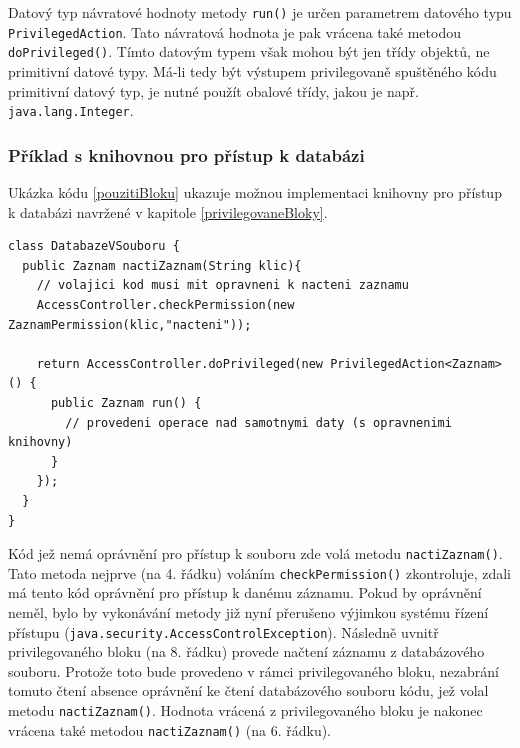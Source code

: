 Datový typ návratové hodnoty metody {\tt run()} je určen parametrem datového typu {\tt PrivilegedAction}.
Tato návratová hodnota je pak vrácena také metodou {\tt doPrivileged()}.
Tímto datovým typem však mohou být jen třídy objektů, ne primitivní datové typy.
Má-li tedy být výstupem privilegovaně spuštěného kódu primitivní datový typ, je nutné použít obalové třídy, jakou je např. {\tt java.lang.Integer}.

\subsubsection{Příklad s knihovnou pro přístup k databázi}\label{databazeVsouboru}

Ukázka kódu \ref{pouzitiBloku} ukazuje možnou implementaci knihovny pro přístup k databázi navržené v kapitole \ref{privilegovaneBloky}.

\begin{lstlisting}[caption=Demonstrační knihovna pro přístup k databázi, label=pouzitiBloku]
class DatabazeVSouboru {
  public Zaznam nactiZaznam(String klic){
    // volajici kod musi mit opravneni k nacteni zaznamu
    AccessController.checkPermission(new ZaznamPermission(klic,"nacteni"));
    
    return AccessController.doPrivileged(new PrivilegedAction<Zaznam>() {
      public Zaznam run() {
        // provedeni operace nad samotnymi daty (s opravnenimi knihovny)
      }
    });
  }
}
\end{lstlisting}

Kód jež nemá oprávnění pro přístup k souboru zde volá metodu {\tt nactiZaznam()}.
Tato metoda nejprve (na 4. řádku) voláním {\tt checkPermission()} zkontroluje, zdali má tento kód oprávnění pro přístup k danému záznamu.
Pokud by oprávnění neměl, bylo by vykonávání metody již nyní přerušeno výjimkou systému řízení přístupu ({\tt java.security.AccessControlException}).
Následně uvnitř privilegovaného bloku (na 8. řádku) provede načtení záznamu z databázového souboru.
Protože toto bude provedeno v rámci privilegovaného bloku, nezabrání tomuto čtení absence oprávnění ke čtení databázového souboru kódu, jež volal metodu {\tt nactiZaznam()}.
Hodnota vrácená z privilegovaného bloku je nakonec vrácena také metodou {\tt nactiZaznam()} (na 6. řádku).

